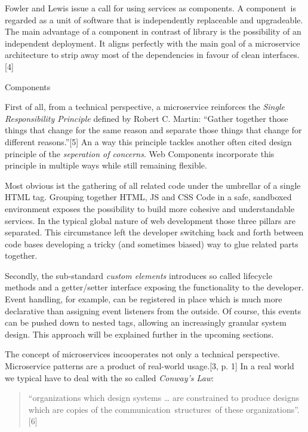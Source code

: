 \documentclass[]{assets/latex/ieee}
\begin{document}
Fowler and Lewis issue a call for using services as components. A
component~is regarded as a unit of software that is independently
replaceable and upgradeable. The main advantage of a component in
contrast of library is the possibility of an independent deployment. It
aligns perfectly with the main goal of a microservice architecture to
strip away most of the dependencies in favour of clean
interfaces.{[}4{]}

Components

First of all, from a technical perspective, a microservice reinforces
the \emph{Single Responsibility Principle} defined by Robert C. Martin:
``Gather together those things that change for the same reason and
separate those things that change for different reasons.''{[}5{]} An a
way this principle tackles another often cited design principle of the
\emph{seperation of concerns}. Web Components incorporate this principle
in multiple ways while still remaining flexible.

Most obvious ist the gathering of all related code under the umbrellar
of a single HTML tag. Grouping together HTML, JS and CSS Code in a safe,
sandboxed environment exposes the possibility to build more cohesive and
understandable services. In the typical global nature of web development
those three pillars are separated. This circumstance left the developer
switching back and forth between code bases developing a tricky (and
sometimes biased) way to glue related parts together.

Secondly, the sub-standard \emph{custom elements} introduces so called
lifecycle methods and a getter/setter interface exposing the
functionality to the developer. Event handling, for example, can be
registered in place which is much more declarative than assigning event
listeners from the outside. Of course, this events can be pushed down to
nested tags, allowing an increasingly granular system design. This
approach will be explained further in the upcoming sections.

The concept of microservices incooperates not only a technical
perspective. Microservice patterns are a product of real-world
usage.{[}3, p. 1{]} In a real world we typical have to deal with the so
called \emph{Conway's Law}:

\begin{quote}
``organizations which design systems \ldots{} are constrained to produce
designs which are copies of the communication~structures~of these
organizations''. {[}6{]}
\end{quote}
\end{document}
